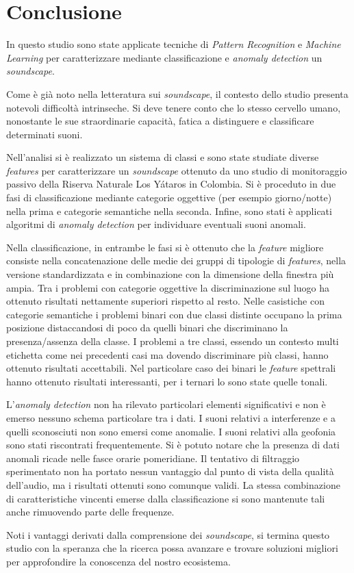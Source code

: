 \chapter{Conclusione}
In questo studio sono state applicate tecniche di \textit{Pattern Recognition} e \textit{Machine Learning} per
caratterizzare mediante classificazione e \textit{anomaly detection} un \textit{soundscape}.

Come è già noto nella letteratura sui \textit{soundscape}, il contesto dello studio presenta notevoli
difficoltà intrinseche. Si deve tenere conto che lo stesso cervello umano, nonostante le sue
straordinarie capacità, fatica a distinguere e classificare determinati suoni.

Nell’analisi si è realizzato un sistema di classi e sono state studiate diverse \textit{features} per
caratterizzare un \textit{soundscape} ottenuto da uno studio di monitoraggio passivo della Riserva
Naturale Los Yátaros in Colombia. Si è proceduto in due fasi di classificazione mediante
categorie oggettive (per esempio giorno/notte) nella prima e categorie semantiche nella seconda. Infine,
sono stati è applicati algoritmi di \textit{anomaly detection} per individuare eventuali suoni anomali.

Nella classificazione, in entrambe le fasi si è ottenuto che la \textit{feature} migliore consiste nella
concatenazione delle medie dei gruppi di tipologie di \textit{features}, nella versione standardizzata e
in combinazione con la dimensione della finestra più ampia. Tra i problemi con categorie
oggettive la discriminazione sul luogo ha ottenuto risultati nettamente superiori rispetto al
resto. Nelle casistiche con categorie semantiche i problemi binari con due classi distinte
occupano la prima posizione distaccandosi di poco da quelli binari che discriminano la
presenza/assenza della classe. I problemi a tre classi, essendo un contesto multi etichetta
come nei precedenti casi ma dovendo discriminare più classi, hanno ottenuto risultati accettabili.
Nel particolare caso dei binari le \textit{feature} spettrali hanno ottenuto risultati interessanti, per i
ternari lo sono state quelle tonali.

L’\textit{anomaly detection} non ha rilevato particolari elementi significativi e non è emerso nessuno
schema particolare tra i dati. I suoni relativi a interferenze e a quelli sconosciuti non sono
emersi come anomalie. I suoni relativi alla geofonia sono stati riscontrati frequentemente. Si
è potuto notare che la presenza di dati anomali ricade nelle fasce orarie pomeridiane.
Il tentativo di filtraggio sperimentato non ha portato nessun vantaggio dal punto di vista della
qualità dell’audio, ma i risultati ottenuti sono comunque validi. La stessa combinazione di
caratteristiche vincenti emerse dalla classificazione si sono mantenute tali anche rimuovendo
parte delle frequenze.

Noti i vantaggi derivati dalla comprensione dei \textit{soundscape}, si termina questo studio con la
speranza che la ricerca possa avanzare e trovare soluzioni migliori per approfondire la
conoscenza del nostro ecosistema.

